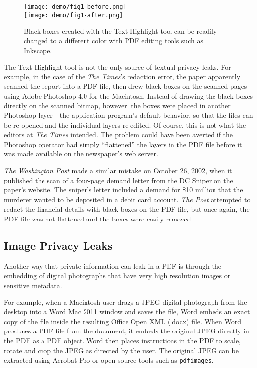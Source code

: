 \begin{figure}
\texttt{[image: demo/fig1-before.png]}\\
\texttt{[image: demo/fig1-after.png]}
\caption{Black boxes created with the Text Highlight tool can be
  readily changed to a different color with PDF editing tools such as Inkscape.}\label{fuschia}
\end{figure}

The Text Highlight tool is not the only source of textual privacy
leaks. For example, in the case of the \emph{The
  Times}'s redaction error, the paper apparently scanned the report
into a PDF file, then
drew black boxes on the scanned pages using Adobe Photoshop 4.0 for
the Macintosh. Instead of drawing the black boxes directly on the
scanned bitmap, however, the boxes were placed in another Photoshop
layer---the application program's default behavior, so that
the files can be re-opened and the individual layers re-edited. Of course, this is not what
the editors at \emph{The Times}  intended. The problem could have
been averted if the Photoshop operator had simply ``flattened'' the
layers in the PDF file before it was made available on the newspaper's web server. 

\emph{The Washington Post} made a similar mistake on October 26, 2002,
when it published the scan of a four-page demand letter from the DC
Sniper on the paper's website. The sniper's letter included a demand
for \$10 million that the murderer wanted to be deposited in a debit
card account. \emph{The Post} attempted to redact
the financial details with black boxes on the PDF file, but once
again, the PDF file was not flattened and the boxes were easily removed~\cite[p.152]{internet-forensics}.

\subsection{Image Privacy Leaks}

Another way that private information can leak in a PDF is through the
embedding of digital photographs that have very high resolution images or
sensitive metadata.

For example, when a Macintosh user drags a JPEG digital photograph from
the desktop into a Word Mac 2011 window and saves the file, Word embeds an
exact copy of the file inside the resulting Office Open XML (.docx)
file. When Word produces a PDF file from the document, it embeds the
original JPEG directly in the PDF as a PDF object. Word then places
instructions in the PDF to scale, rotate and crop the JPEG as directed
by the user. The original JPEG can be extracted using Acrobat Pro or open source
tools such as \texttt{pdfimages}. 


